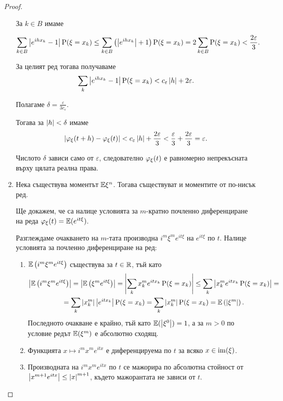 \documentclass[numbers=endperiod, DIV=15, bibliography=totocnumbered]{scrartcl}
\begin{document}
\begin{proof}
\begin{enumerate}
    За $k \in B$ имаме

    \begin{displaymath}
      \sum_{k \in B} \left\vert e^{ih x_k} - 1 \right\vert \operatorname{P}(\xi = x_k)
      \leq
      \sum_{k \in B} \left( \left\vert e^{ih x_k} \right\vert + 1 \right) \operatorname{P}(\xi = x_k)
      =
      2 \sum_{k \in B} \operatorname{P}(\xi = x_k)
      <
      \frac {2\varepsilon} 3.
    \end{displaymath}

    За целият ред тогава получаваме
    \begin{displaymath}
      \sum_k \left\vert e^{ih x_k} - 1 \right\vert \operatorname{P}(\xi = x_k)
      <
      c_\varepsilon \left\vert h \right\vert + 2 \varepsilon.
    \end{displaymath}

    Полагаме $\delta = \frac \varepsilon {3 c_\varepsilon}$.

    Тогава за $\left\vert h \right\vert < \delta$ имаме
    \begin{displaymath}
      \left\vert \varphi_\xi(t + h) - \varphi_\xi(t) \right\vert
      <
      c_\varepsilon \left\vert h \right\vert + \frac {2\varepsilon} 3
      <
      \frac {\varepsilon} 3 + \frac {2\varepsilon} 3
      =
      \varepsilon.
    \end{displaymath}

    Числото $\delta$ зависи само от $\varepsilon$, следователно $\varphi_\xi(t)$ е равномерно непрекъсната върху цялата реална права.

    \item Нека съществува моментът $\mathbb{E} \xi^n$. Тогава съществуват и моментите от по-нисък ред.

    Ще докажем, че са налице условията за $m$-кратно почленно диференциране на реда $\varphi_\xi(t) = \mathbb{E} (e^{it \xi})$.

    Разглеждаме очакването на $m$-тата производна $i^m \xi^m e^{it \xi}$ на $e^{it \xi}$ по $t$. Налице условията за почленно диференциране на ред:
    \begin{enumerate}
      \item $\mathbb{E} \left( i^m \xi^m e^{it \xi} \right)$ съществува за $t \in \mathbb{R}$, тъй като
      \begin{multline*}
        \left\vert \mathbb{E} \left( i^m \xi^m e^{it \xi} \right) \right\vert
        =
        \left\vert \mathbb{E} \left( \xi^m e^{it \xi} \right) \right\vert
        =
        \left\vert \sum_k x_k^m e^{it x_k} \operatorname{P}(\xi = x_k) \right\vert
        \leq
        \sum_k \left\vert x_k^m e^{it x_k} \operatorname{P}(\xi = x_k) \right\vert
        = \\ =
        \sum_k \left\vert x_k^m \right\vert \left\vert e^{it x_k} \right\vert \operatorname{P}(\xi = x_k)
        =
        \sum_k \left\vert x_k^m \right\vert \operatorname{P}(\xi = x_k)
        =
        \mathbb{E} \left( {\left\vert \xi^m \right\vert} \right).
      \end{multline*}
      Последното очакване е крайно, тъй като $\mathbb{E}(\left\vert \xi^0 \right\vert) = 1$, а за $m > 0$ по условие редът $\mathbb{E}(\xi^m)$ е абсолютно сходящ.
      \item Функцията $x \mapsto i^m x^m e^{it x}$ е диференцируема по $t$ за всяко $x \in \operatorname{im}(\xi)$.
      \item Производната на $i^m x^m e^{it x}$ по $t$ се мажорира по абсолютна стойност от $\left\vert x^{m+1} e^{it x} \right\vert \leq {\left\vert x \right\vert}^{m+1}$, където мажорантата не зависи от $t$.
    \end{enumerate}


\end{enumerate}
\end{proof}
\end{document}

